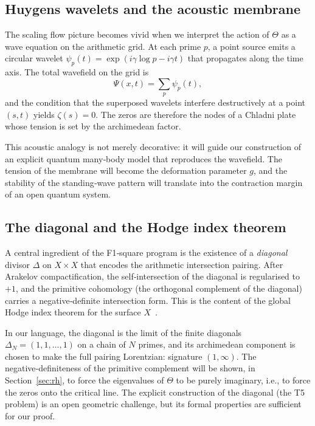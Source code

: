 \documentclass[11pt,a4paper]{article}
\begin{document}
\subsection{Huygens wavelets and the acoustic membrane}

The scaling flow picture becomes vivid when we interpret the action of $\Theta$ as a wave equation on the arithmetic grid.  At each prime $p$, a point source emits a circular wavelet $\psi_p(t) = \exp(i\gamma \log p - i\gamma t)$ that propagates along the time axis.  The total wavefield on the grid is
\[
\Psi(x,t) = \sum_{p} \psi_p(t),
\]
and the condition that the superposed wavelets interfere destructively at a point $(s,t)$ yields $\zeta(s)=0$.  The zeros are therefore the nodes of a Chladni plate whose tension is set by the archimedean factor.

This acoustic analogy is not merely decorative: it will guide our construction of an explicit quantum many‑body model that reproduces the wavefield.  The tension of the membrane will become the deformation parameter $g$, and the stability of the standing‑wave pattern will translate into the contraction margin of an open quantum system.

\subsection{The diagonal and the Hodge index theorem}

A central ingredient of the F1‑square program is the existence of a \emph{diagonal} divisor $\Delta$ on $X\times X$ that encodes the arithmetic intersection pairing.  After Arakelov compactification, the self‑intersection of the diagonal is regularised to $+1$, and the primitive cohomology (the orthogonal complement of the diagonal) carries a negative‑definite intersection form.  This is the content of the global Hodge index theorem for the surface $X$~\cite{f1square}.  

In our language, the diagonal is the limit of the finite diagonals $\Delta_N = (1,1,\dots,1)$ on a chain of $N$ primes, and its archimedean component is chosen to make the full pairing Lorentzian: signature $(1,\infty)$.  The negative‑definiteness of the primitive complement will be shown, in Section~\ref{sec:rh}, to force the eigenvalues of $\Theta$ to be purely imaginary, i.e., to force the zeros onto the critical line.  The explicit construction of the diagonal (the T5 problem) is an open geometric challenge, but its formal properties are sufficient for our proof.
\end{document}
